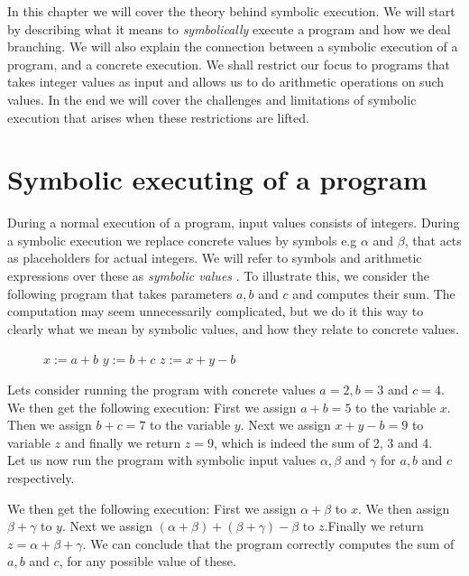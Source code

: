In this chapter we will cover the theory behind symbolic execution. We will start by describing what it means to \emph{symbolically} execute a program and how we deal branching. We will also explain the connection between a symbolic execution of a program, and a concrete execution. We shall restrict our focus to programs that takes integer values as input and allows us to do arithmetic operations on such values. In the end we will cover the challenges and limitations of symbolic execution that arises when these restrictions are lifted. 


\section{Symbolic executing of a program}
	
	During a normal execution of a program, input values consists of integers. During a symbolic execution we replace concrete values by symbols e.g $\alpha$ and $ \beta$, that acts as placeholders for actual integers. We will refer to symbols and arithmetic expressions over these as \emph{symbolic values} \citep{CadarSen13} \citep{King76}.                 
	To illustrate this, we consider the following program that takes parameters $a, b$ and $ c$ and computes their sum. The computation may seem unnecessarily complicated, but we do it this way to clearly what we mean by symbolic values, and how they relate to concrete values.
	\begin{figure}[!h]
		\begin{algorithmic}
			\State $ x := a + b$
			\State $ y := b + c$
			\State $ z := x + y - b$
			\State {}
			\EndProcedure
		\end{algorithmic}
	\end{figure}

	\sumprogram{}
	\newpage
	Lets consider running the program with concrete values $a = 2, b = 3$ and $c = 4$. We then get the following execution:
	First we assign $a+b = 5$ to the variable $x$. Then we assign $b + c = 7$ to the variable $y$. Next we assign $x + y - b = 9$ to variable $z$ and finally we return $z = 9$, which is indeed the sum of 2, 3 and 4. 
	\\
	Let us now run the program with symbolic input values $\alpha, \beta$ and $\gamma$ for $a, b$ and $c$ respectively. 

	
	We then get the following execution: First we assign $\alpha + \beta$ to $x$. We then assign $\beta + \gamma$ to $y$. Next we assign $(\alpha + \beta) + (\beta + \gamma) - \beta$ to $z$.Finally we return $z = \alpha + \beta + \gamma$. We can conclude that the program correctly computes the sum of $a, b$ and $c$, for any possible value of these.
	

